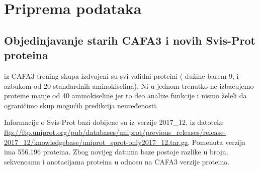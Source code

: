 
\chapter{Priprema podataka} %

\label{Priprema_podataka} %

\section{Objedinjavanje starih CAFA3 i novih Svis-Prot proteina}

iz CAFA3 trening skupa izdvojeni su svi validni proteini ( dužine barem 9, i
azbukom od 20 standardnih aminokiselina). Ni u jednom trenutko ne izbacujemo
proteine manje od 40 aminokiseline jer to deo analize funkcije i nismo želeli
da ograničimo skup mogućih predikcija neuređenosti.

Informacije o Svis-Prot bazi dobijene su iz verzije 2017\_12, iz datoteke
\url{ftp://ftp.uniprot.org/pub/databases/uniprot/previous_releases/release-2017_12/knowledgebase/uniprot_sprot-only2017_12.tar.gz}.
Pomenuta verzija ima 556.196 proteina. Zbog novijeg datuma baze postoje razlike
u broju, sekvencama i  anotacijama proteina u odnosu na CAFA3 verzije proteina.

\section{}
